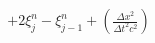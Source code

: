 \documentclass[preview]{standalone}
\begin{document}
\begin{align*}
+ 2 \xi_{j}^{n} - \xi_{j-1}^{n} + \left(\frac{\Delta x^2}{\Delta t^2c^2}\right)
\end{align*}
\end{document}
